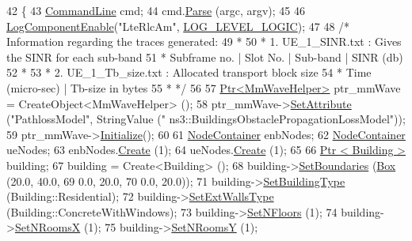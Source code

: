 \begin{DoxyCode}
42 \{
43   \hyperlink{classns3_1_1CommandLine}{CommandLine} cmd;
44   cmd.\hyperlink{classns3_1_1CommandLine_a5c10b85b3207e5ecb48d907966923156}{Parse} (argc, argv);
45 
46   \hyperlink{namespacens3_adc4ef4f00bb2f5f4edae67fc3bc27f20}{LogComponentEnable}(\textcolor{stringliteral}{"LteRlcAm"}, \hyperlink{namespacens3_aa6464a4d69551a9cc968e17a65f39bdba11526a7d4f0e6b4e1bac5754781a4f2a}{LOG\_LEVEL\_LOGIC});
47 
48   \textcolor{comment}{/* Information regarding the traces generated:}
49 \textcolor{comment}{   *}
50 \textcolor{comment}{   * 1. UE\_1\_SINR.txt : Gives the SINR for each sub-band}
51 \textcolor{comment}{   *    Subframe no.  | Slot No. | Sub-band  | SINR (db)}
52 \textcolor{comment}{   *}
53 \textcolor{comment}{   * 2. UE\_1\_Tb\_size.txt : Allocated transport block size}
54 \textcolor{comment}{   *    Time (micro-sec)  |  Tb-size in bytes}
55 \textcolor{comment}{   * */}
56 
57   \hyperlink{classns3_1_1Ptr}{Ptr<MmWaveHelper>} ptr\_mmWave = CreateObject<MmWaveHelper> ();
58   ptr\_mmWave->\hyperlink{classns3_1_1ObjectBase_ac60245d3ea4123bbc9b1d391f1f6592f}{SetAttribute} (\textcolor{stringliteral}{"PathlossModel"}, StringValue (\textcolor{stringliteral}{"
      ns3::BuildingsObstaclePropagationLossModel"}));
59   ptr\_mmWave->\hyperlink{classns3_1_1Object_af4411cb29971772fcd09203474a95078}{Initialize}();
60 
61   \hyperlink{classns3_1_1NodeContainer}{NodeContainer} enbNodes;
62   \hyperlink{classns3_1_1NodeContainer}{NodeContainer} ueNodes;
63   enbNodes.\hyperlink{classns3_1_1NodeContainer_a787f059e2813e8b951cc6914d11dfe69}{Create} (1);
64   ueNodes.\hyperlink{classns3_1_1NodeContainer_a787f059e2813e8b951cc6914d11dfe69}{Create} (1);
65 
66   \hyperlink{classns3_1_1Ptr}{Ptr < Building >} building;
67   building = Create<Building> ();
68   building->\hyperlink{classns3_1_1Building_a4b69659f05a983f06e33e7db62415915}{SetBoundaries} (\hyperlink{classns3_1_1Box}{Box} (20.0, 40.0,
69                                 0.0, 20.0,
70                                 0.0, 20.0));
71   building->\hyperlink{classns3_1_1Building_a2f193ed27d25ed8bf29962d3c7d77204}{SetBuildingType} (Building::Residential);
72   building->\hyperlink{classns3_1_1Building_a8084b2aafb9ca8bcb775fad0319d42e8}{SetExtWallsType} (Building::ConcreteWithWindows);
73   building->\hyperlink{classns3_1_1Building_ae9f97075b5c8bf4685703e30ed049791}{SetNFloors} (1);
74   building->\hyperlink{classns3_1_1Building_a60eac680f1059fb9d883a659607e2fae}{SetNRoomsX} (1);
75   building->\hyperlink{classns3_1_1Building_a9103ee5b5edf013624d7e18422c4ba06}{SetNRoomsY} (1);

\end{DoxyCode}
